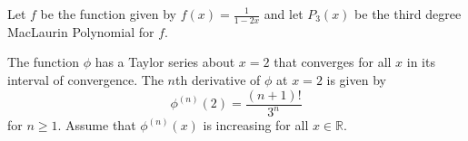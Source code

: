 \documentclass[addpoints]{exam}
\begin{document}
\begin{questions}

\newpage

\question Let $f$ be the function given by $\displaystyle f(x)=\frac{1}{1-2x}$ and let $P_3(x)$ be the third degree MacLaurin Polynomial for $f$.

\newpage

\question The function $\phi$ has a Taylor series about $x=2$ that converges for all $x$ in its interval of convergence. The $n$th derivative of $\phi$ at $x=2$ is given by \[\phi^{(n)}(2)=\frac{(n+1)!}{3^n}\] for $n\ge1$. Assume that $\phi^{(n)}(x)$ is increasing for all $x\in\mathbb{R}$.
\begin{parts}

\end{parts}
\end{questions}
\end{document}
